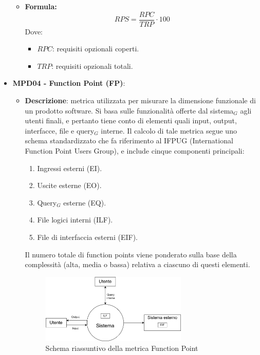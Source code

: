 \documentclass[10pt]{article}
\begin{document}
\begin{justify}
\begin{itemize}
\begin{itemize}
                \item   \textbf{Formula:}
                        \[
                        RPS = \frac{RPC}{TRP} \cdot 100
                        \]
                        Dove:
                        \begin{itemize}
                            \item $RPC$: requisiti opzionali coperti.
                            \item $TRP$: requisiti opzionali totali.
                        \end{itemize}
            \end{itemize}
    \item   \textbf{MPD04 - Function Point (FP)}:
            \begin{itemize}
                \item   \textbf{Descrizione}: metrica utilizzata per misurare la dimensione funzionale di un prodotto software. Si basa sulle funzionalità offerte dal sistema$_G$ agli utenti finali, e pertanto tiene conto di elementi quali input, output, interfacce, file e query$_G$ interne.
                Il calcolo di tale metrica segue uno schema standardizzato che fa riferimento al IFPUG (International Function Point Users Group), e include cinque componenti principali:
                \begin{enumerate}
                    \item Ingressi esterni (EI).
                    \item Uscite esterne (EO).
                    \item Query$_G$ esterne (EQ).
                    \item File logici interni (ILF).
                    \item File di interfaccia esterni (EIF).
                \end{enumerate}
                Il numero totale di function points viene ponderato sulla base della complessità (alta, media o bassa) relativa a ciascuno di questi elementi.
                \begin{figure}[H]
                \centering
                \includegraphics[width=0.7\textwidth]{FunctionPointFigure.png}
                \caption{Schema riassuntivo della metrica Function Point}
                \end{figure}
            \end{itemize}
\end{itemize}


\end{justify}
\end{document}
